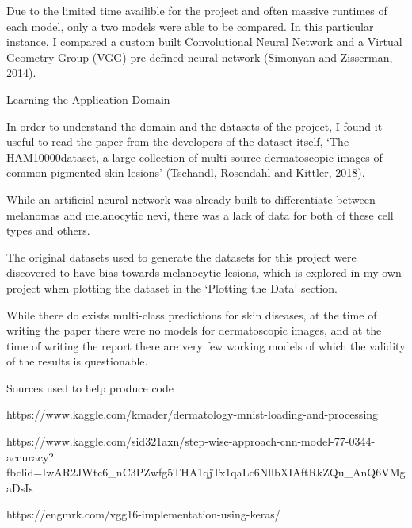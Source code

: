 \documentclass[11pt]{article}
\begin{document}
Due to the limited time availible for the project and often massive
runtimes of each model, only a two models were able to be compared. In
this particular instance, I compared a custom built Convolutional Neural
Network and a Virtual Geometry Group (VGG) pre-defined neural network
(Simonyan and Zisserman, 2014).

    Learning the Application Domain

In order to understand the domain and the datasets of the project, I
found it useful to read the paper from the developers of the dataset
itself, `The HAM10000dataset, a large collection of multi-source
dermatoscopic images of common pigmented skin lesions' (Tschandl,
Rosendahl and Kittler, 2018).

While an artificial neural network was already built to differentiate
between melanomas and melanocytic nevi, there was a lack of data for
both of these cell types and others.

The original datasets used to generate the datasets for this project
were discovered to have bias towards melanocytic lesions, which is
explored in my own project when plotting the dataset in the `Plotting
the Data' section.

While there do exists multi-class predictions for skin diseases, at the
time of writing the paper there were no models for dermatoscopic images,
and at the time of writing the report there are very few working models
of which the validity of the results is questionable.

    Sources used to help produce code

https://www.kaggle.com/kmader/dermatology-mnist-loading-and-processing

https://www.kaggle.com/sid321axn/step-wise-approach-cnn-model-77-0344-accuracy?fbclid=IwAR2JWtc6\_nC3PZwfg5THA1qjTx1qaLc6NllbXIAftRkZQu\_AnQ6VMgaDsIs

https://engmrk.com/vgg16-implementation-using-keras/
\end{document}
